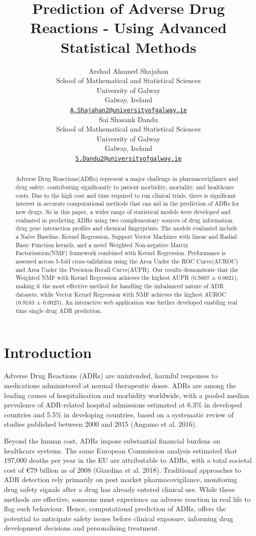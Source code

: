 \documentclass{article}
\title{Prediction of Adverse Drug Reactions - Using Advanced Statistical
Methods}
\author{
    Arshad Ahamed Shajahan
   \\
    School of Mathematical and Statistical Sciences \\
    University of Galway \\
  Galway, Ireland \\
  \texttt{\href{mailto:A.Shajahan2@universityofgalway.ie}{\nolinkurl{A.Shajahan2@universityofgalway.ie}}} \\
   \And
    Sai Shasank Dandu
   \\
    School of Mathematical and Statistical Sciences \\
    University of Galway \\
  Galway, Ireland \\
  \texttt{\href{mailto:S.Dandu2@universityofgalway.ie}{\nolinkurl{S.Dandu2@universityofgalway.ie}}} \\
  }
\begin{document}
\maketitle


\begin{abstract}
Adverse Drug Reactions(ADRs) represent a major challenge in
pharmacovigilance and drug safety, contributing significantly to patient
morbidity, mortality, and healthcare costs. Due to the high cost and
time required to run clinical trials, there is significant interest in
accurate computational methods that can aid in the prediction of ADRs
for new drugs. So in this paper, a wider range of statistical models
were developed and evaluated in predicting ADRs using two complementary
sources of drug information, drug gene interaction profiles and chemical
fingerprints. The models evaluated include a Naïve Baseline, Kernel
Regression, Support Vector Machines with linear and Radial Basic
Function kernels, and a novel Weighted Non-negative Matrix
Factorisation(NMF) framework combined with Kernel Regression.
Performance is assessed across 5-fold cross-validation using the Area
Under the ROC Curve(AUROC) and Area Under the Precision-Recall
Curve(AUPR). Our results demonstrate that the Weighted NMF with Kernel
Regression achieves the highest AUPR (0.5007 ± 0.0021), making it the
most effective method for handling the imbalanced nature of ADR
datasets, while Vector Kernel Regression with NMF achieves the highest
AUROC (0.9183 ± 0.0025). An interactive web application was further
developed enabling real time single drug ADR prediction.
\end{abstract}


\section{Introduction}\label{introduction}

Adverse Drug Reactions (ADRs) are unintended, harmful responses to
medications administered at normal therapeutic doses. ADRs are among the
leading causes of hospitalisation and morbidity worldwide, with a pooled
median prevalence of ADR-related hospital admissions estimated at 6.3\%
in developed countries and 5.5\% in developing countries, based on a
systematic review of studies published between 2000 and 2015 (Angamo et
al. 2016).

Beyond the human cost, ADRs impose substantial financial burdens on
healthcare systems. The same European Commission analysis estimated that
197,000 deaths per year in the EU are attributable to ADRs, with a total
societal cost of €79 billion as of 2008 (Giardina et al. 2018).
Traditional approaches to ADR detection rely primarily on post market
pharmacovigilance, monitoring drug safety signals after a drug has
already entered clinical use. While these methods are effective, someone
must experience an adverse reaction in real life to flag such behaviour.
Hence, computational prediction of ADRs, offers the potential to
anticipate safety issues before clinical exposure, informing drug
development decisions and personalising treatment.
\end{document}
